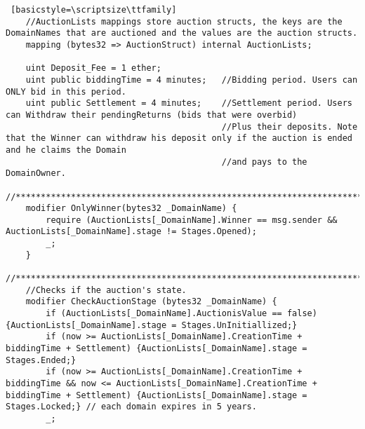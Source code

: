 \begin{lstlisting} [basicstyle=\scriptsize\ttfamily]
    //AuctionLists mappings store auction structs, the keys are the DomainNames that are auctioned and the values are the auction structs.
    mapping (bytes32 => AuctionStruct) internal AuctionLists;

    uint Deposit_Fee = 1 ether;
    uint public biddingTime = 4 minutes;   //Bidding period. Users can ONLY bid in this period.
    uint public Settlement = 4 minutes;    //Settlement period. Users can Withdraw their pendingReturns (bids that were overbid)
                                           //Plus their deposits. Note that the Winner can withdraw his deposit only if the auction is ended and he claims the Domain
                                           //and pays to the DomainOwner.

//********************************************************************************************************************
    modifier OnlyWinner(bytes32 _DomainName) {
        require (AuctionLists[_DomainName].Winner == msg.sender && AuctionLists[_DomainName].stage != Stages.Opened);
        _;
    }

//********************************************************************************************************************
    //Checks if the auction's state.
    modifier CheckAuctionStage (bytes32 _DomainName) {
        if (AuctionLists[_DomainName].AuctionisValue == false) {AuctionLists[_DomainName].stage = Stages.UnInitiallized;}
        if (now >= AuctionLists[_DomainName].CreationTime + biddingTime + Settlement) {AuctionLists[_DomainName].stage = Stages.Ended;}
        if (now >= AuctionLists[_DomainName].CreationTime + biddingTime && now <= AuctionLists[_DomainName].CreationTime + biddingTime + Settlement) {AuctionLists[_DomainName].stage = Stages.Locked;} // each domain expires in 5 years.
        _;


\end{lstlisting}
